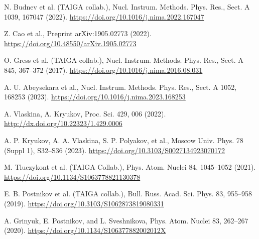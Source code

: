 \documentclass[reprint,
superscriptaddress,
amsmath,amssymb,aps,showkeys,showpacs,
twoside,final,secnumarabic,%
nofootinbib]{revtex4-2}
\begin{document}
\begin{thebibliography}{}


N. Budnev et al. (TAIGA collab.),
Nucl. Instrum. Methods. Phys. Res., Sect. A 1039, 167047 (2022).
\url{https://doi.org/10.1016/j.nima.2022.167047}

Z. Cao et al.,
Preprint arXiv:1905.02773 (2022).
\url{https://doi.org/10.48550/arXiv.1905.02773}

O. Gress et al. (TAIGA collab.),
Nucl. Instrum. Methods. Phys. Res., Sect. A 845, 367--372 (2017).
\url{https://doi.org/10.1016/j.nima.2016.08.031}

A. U. Abeysekara et al.,
Nucl. Instrum. Methods. Phys. Res., Sect. A 1052, 168253 (2023).
\url{https://doi.org/10.1016/j.nima.2023.168253}

A. Vlaskina, A. Kryukov,
Proc. Sci. 429, 006 (2022).
\url{http://dx.doi.org/10.22323/1.429.0006}

A. P. Kryukov, A. A. Vlaskina, S. P. Polyakov, et al.,
Moscow Univ. Phys. 78 (Suppl 1), S32--S36 (2023). 
\url{https://doi.org/10.3103/S0027134923070172}

M. Tluczykont et al. (TAIGA Collab.),
Phys. Atom. Nuclei 84, 1045--1052 (2021).
\url{https://doi.org/10.1134/S1063778821130378}

E. B. Postnikov et al. (TAIGA collab.),
Bull. Russ. Acad. Sci. Phys. 83, 955--958 (2019).
\url{https://doi.org/10.3103/S1062873819080331}

A. Grinyuk, E. Postnikov, and L. Sveshnikova,
Phys. Atom. Nuclei 83, 262--267 (2020).
\url{https://doi.org/10.1134/S106377882002012X}


\end{thebibliography}
\end{document}
